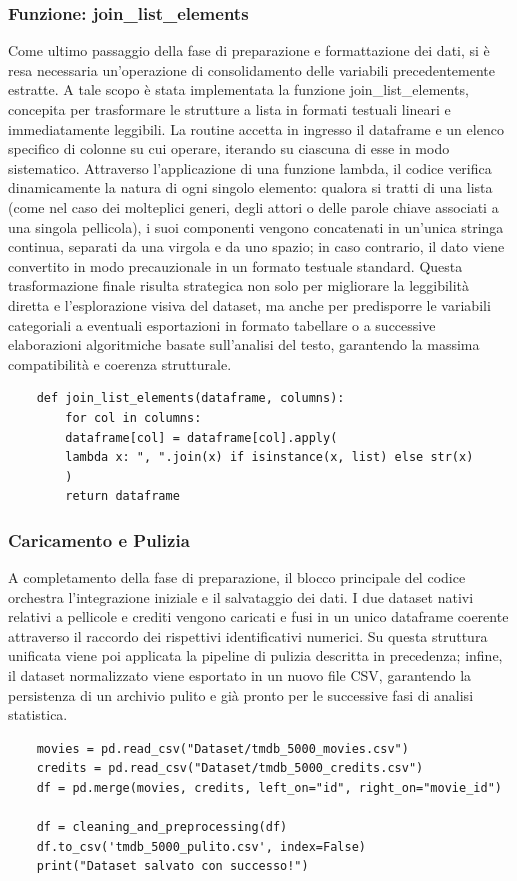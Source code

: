 \documentclass{article}
\begin{document}
\subsubsection{Funzione: join\_list\_elements}
Come ultimo passaggio della fase di preparazione e formattazione dei dati, si \`e resa necessaria un'operazione di consolidamento delle variabili precedentemente estratte. A tale scopo \`e stata implementata la funzione join\_list\_elements, concepita per trasformare le strutture a lista in formati testuali lineari e immediatamente leggibili. La routine accetta in ingresso il dataframe e un elenco specifico di colonne su cui operare, iterando su ciascuna di esse in modo sistematico. Attraverso l'applicazione di una funzione lambda, il codice verifica dinamicamente la natura di ogni singolo elemento: qualora si tratti di una lista (come nel caso dei molteplici generi, degli attori o delle parole chiave associati a una singola pellicola), i suoi componenti vengono concatenati in un'unica stringa continua, separati da una virgola e da uno spazio; in caso contrario, il dato viene convertito in modo precauzionale in un formato testuale standard. Questa trasformazione finale risulta strategica non solo per migliorare la leggibilit\`a diretta e l'esplorazione visiva del dataset, ma anche per predisporre le variabili categoriali a eventuali esportazioni in formato tabellare o a successive elaborazioni algoritmiche basate sull'analisi del testo, garantendo la massima compatibilit\`a e coerenza strutturale.
\begin{lstlisting}
	def join_list_elements(dataframe, columns):
		for col in columns:
		dataframe[col] = dataframe[col].apply(
		lambda x: ", ".join(x) if isinstance(x, list) else str(x)
		)
		return dataframe
\end{lstlisting}
\subsubsection{Caricamento e Pulizia}
A completamento della fase di preparazione, il blocco principale del codice orchestra l'integrazione iniziale e il salvataggio dei dati. I due dataset nativi relativi a pellicole e crediti vengono caricati e fusi in un unico dataframe coerente attraverso il raccordo dei rispettivi identificativi numerici. Su questa struttura unificata viene poi applicata la pipeline di pulizia descritta in precedenza; infine, il dataset normalizzato viene esportato in un nuovo file CSV, garantendo la persistenza di un archivio pulito e gi\`a pronto per le successive fasi di analisi statistica.
\begin{lstlisting}
	movies = pd.read_csv("Dataset/tmdb_5000_movies.csv")
	credits = pd.read_csv("Dataset/tmdb_5000_credits.csv")
	df = pd.merge(movies, credits, left_on="id", right_on="movie_id")
	
	df = cleaning_and_preprocessing(df)
	df.to_csv('tmdb_5000_pulito.csv', index=False)
	print("Dataset salvato con successo!")
\end{lstlisting}
\end{document}
